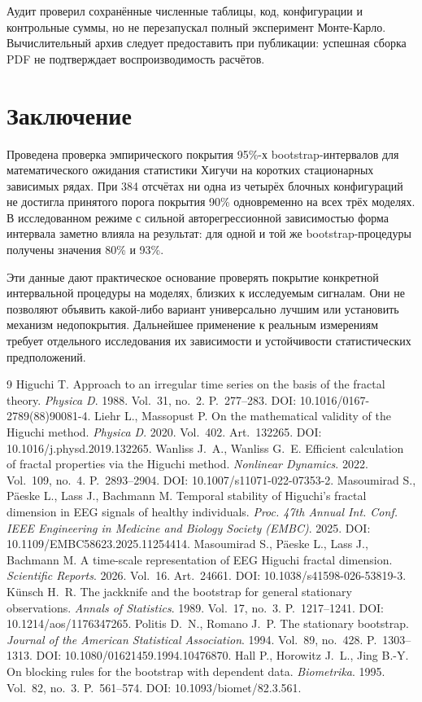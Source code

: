 Аудит проверил сохранённые численные таблицы, код, конфигурации и контрольные суммы, но не перезапускал полный эксперимент Монте-Карло. Вычислительный архив следует предоставить при публикации: успешная сборка PDF не подтверждает воспроизводимость расчётов.

\section{Заключение}

Проведена проверка эмпирического покрытия 95\%-х bootstrap-интервалов для математического ожидания статистики Хигучи на коротких стационарных зависимых рядах. При 384 отсчётах ни одна из четырёх блочных конфигураций не достигла принятого порога покрытия 90\% одновременно на всех трёх моделях. В исследованном режиме с сильной авторегрессионной зависимостью форма интервала заметно влияла на результат: для одной и той же bootstrap-процедуры получены значения 80\% и 93\%.

Эти данные дают практическое основание проверять покрытие конкретной интервальной процедуры на моделях, близких к исследуемым сигналам. Они не позволяют объявить какой-либо вариант универсально лучшим или установить механизм недопокрытия. Дальнейшее применение к реальным измерениям требует отдельного исследования их зависимости и устойчивости статистических предположений.

\begin{thebibliography}{9}
 Higuchi T. Approach to an irregular time series on the basis of the fractal theory. \textit{Physica D}. 1988. Vol.~31, no.~2. P.~277--283. DOI: 10.1016/0167-2789(88)90081-4.
 Liehr L., Massopust P. On the mathematical validity of the Higuchi method. \textit{Physica D}. 2020. Vol.~402. Art.~132265. DOI: 10.1016/j.physd.2019.132265.
 Wanliss J.~A., Wanliss G.~E. Efficient calculation of fractal properties via the Higuchi method. \textit{Nonlinear Dynamics}. 2022. Vol.~109, no.~4. P.~2893--2904. DOI: 10.1007/s11071-022-07353-2.
 Masoumirad S., P\"aeske L., Lass J., Bachmann M. Temporal stability of Higuchi's fractal dimension in EEG signals of healthy individuals. \textit{Proc. 47th Annual Int. Conf. IEEE Engineering in Medicine and Biology Society (EMBC)}. 2025. DOI: 10.1109/EMBC58623.2025.11254414.
 Masoumirad S., P\"aeske L., Lass J., Bachmann M. A time-scale representation of EEG Higuchi fractal dimension. \textit{Scientific Reports}. 2026. Vol.~16. Art.~24661. DOI: 10.1038/s41598-026-53819-3.
 K\"unsch H.~R. The jackknife and the bootstrap for general stationary observations. \textit{Annals of Statistics}. 1989. Vol.~17, no.~3. P.~1217--1241. DOI: 10.1214/aos/1176347265.
 Politis D.~N., Romano J.~P. The stationary bootstrap. \textit{Journal of the American Statistical Association}. 1994. Vol.~89, no.~428. P.~1303--1313. DOI: 10.1080/01621459.1994.10476870.
 Hall P., Horowitz J.~L., Jing B.-Y. On blocking rules for the bootstrap with dependent data. \textit{Biometrika}. 1995. Vol.~82, no.~3. P.~561--574. DOI: 10.1093/biomet/82.3.561.
\end{thebibliography}
